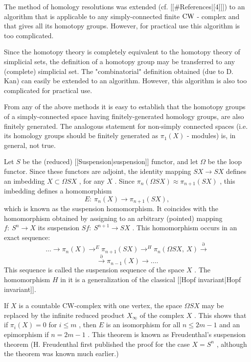 The method of homology resolutions was extended (cf. [[#References|[4]]]) to an algorithm that is applicable to any simply-connected finite $   \mathop{\rm CW}\nolimits $ -
complex and that gives all its homotopy groups. However, for practical use this algorithm is too complicated.

Since the homotopy theory is completely equivalent to the homotopy theory of simplicial sets, the definition of a homotopy group may be transferred to any (complete) simplicial set. The  "combinatorial"  definition obtained (due to D. Kan) can easily be extended to an algorithm. However, this algorithm is also too complicated for practical use.

From any of the above methods it is easy to establish that the homotopy groups of a simply-connected space having finitely-generated homology groups, are also finitely generated. The analogous statement for non-simply connected spaces (i.e. its homology groups should be finitely generated as $  \pi _{1} (X) $ -
modules) is, in general, not true.

Let $  S $ 
be the (reduced) [[Suspension|suspension]] functor, and let $  \Omega $ 
be the loop functor. Since these functors are adjoint, the identity mapping $  S X \rightarrow S X $ 
defines an imbedding $  X \subset \Omega S X $ , 
for any $  X $ . 
Since $  \pi _{n} ( \Omega S X ) \approx \pi _{n+1} ( S X ) $ , 
this imbedding defines a homomorphism$$ 
E : \  \pi _{n} ( X )   \rightarrow   \pi _{n+1} ( S X ) ,
 $$ 
which is known as the suspension homomorphism. It coincides with the homomorphism obtained by assigning to an arbitrary (pointed) mapping $  f : \  S ^{n} \rightarrow X $ 
its suspension $  S f : \  S ^{n+1} \rightarrow S X $ . 
This homomorphism occurs in an exact sequence:$$ 
{} \dots \rightarrow   \pi _{n} (X)   \rightarrow ^ E  
\pi _{n+1} ( S X )   \rightarrow ^ H   \pi _{n}
( \Omega S X ,\  X )    \stackrel \partial  \rightarrow  
 $$ 
$$ 
 \stackrel \partial  \rightarrow     \pi _{n-1} (X)   \rightarrow \dots .
 $$ 
This sequence is called the suspension sequence of the space $  X $ . 
The homomorphism $  H $ 
in it is a generalization of the classical [[Hopf invariant|Hopf invariant]].

If $  X $ 
is a countable CW-complex with one vertex, the space $  \Omega SX $ 
may be replaced by the infinite reduced product $  X _ \infty  $ 
of the complex $  X $ . 
This shows that if $  \pi _{i} (X) = 0 $ 
for $  i \leq m $ , 
then $  E $ 
is an isomorphism for all $  n \leq 2m - 1 $ 
and an epimorphism if $  n = 2m - 1 $ . 
This theorem is known as Freudenthal's suspension theorem (H. Freudenthal first published the proof for the case $  X = S ^{n} $ , 
although the theorem was known much earlier.)


